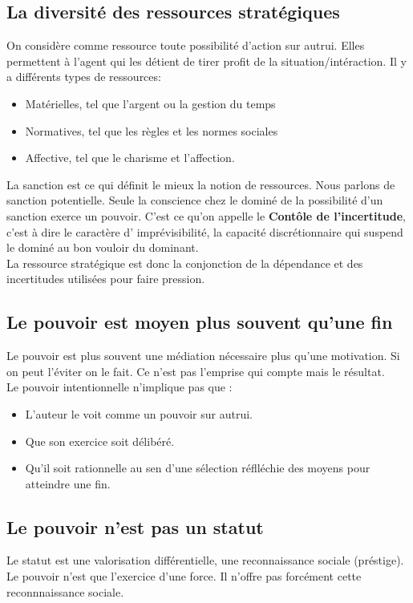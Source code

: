 \documentclass[11pt]{article} %
\begin{document}
	\subsection{La diversité des ressources stratégiques}
			On considère comme ressource toute possibilité d'action sur autrui. Elles permettent à l'agent 
			qui les détient de tirer profit de la situation/intéraction. Il y a différents types de ressources:
			\begin{itemize}
				\item Matérielles, tel que l'argent ou la gestion du temps
				\item Normatives, tel que les règles et les normes sociales
				\item Affective, tel que le charisme et l'affection.
			\end{itemize}
			La sanction est ce qui définit le mieux la notion de ressources. Nous parlons de sanction 
			potentielle. Seule la conscience chez le dominé de la possibilité d'un sanction exerce un pouvoir.
			C'est ce qu'on appelle le \textbf{Contôle de l'incertitude}, c'est à dire le caractère d'
			imprévisibilité, la capacité discrétionnaire qui suspend le dominé au bon vouloir du dominant.\\
			La ressource stratégique est donc la conjonction de la dépendance et des incertitudes utilisées 
			pour faire pression.
	\subsection{Le pouvoir est moyen plus souvent qu'une fin}
		Le pouvoir est plus souvent une médiation nécessaire plus qu'une motivation. Si on peut l'éviter 
		on le fait. Ce n'est pas l'emprise qui compte mais le résultat.\\
		Le pouvoir intentionnelle n'implique pas que :
		\begin{itemize}
			\item L'auteur le voit comme un pouvoir sur autrui.
			\item Que son exercice soit délibéré.
			\item Qu'il soit rationnelle au sen d'une sélection réflléchie des moyens pour atteindre une fin.
		\end{itemize}
	\subsection{Le pouvoir n'est pas un statut}
		Le statut est une valorisation différentielle, une reconnaissance sociale (préstige). Le pouvoir n'est que 
		l'exercice d'une force. Il n'offre pas forcément cette reconnnaissance sociale.
\end{document}
